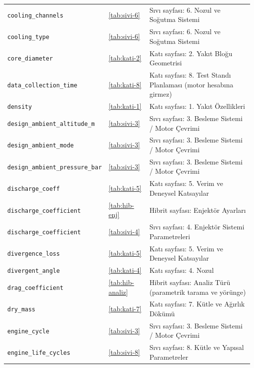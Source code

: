 \documentclass[11pt,a4paper]{article}
\begin{document}
{\begin{longtable}{@{}>{\raggedright\arraybackslash}p{5.2cm}p{1.4cm}>{\raggedright\arraybackslash}p{7.4cm}@{}}
\texttt{cooling\_\allowbreak{}channels} & \ref{tab:sivi-6} & Sıvı sayfası: 6. Nozul ve Soğutma Sistemi \\
\texttt{cooling\_\allowbreak{}type} & \ref{tab:sivi-6} & Sıvı sayfası: 6. Nozul ve Soğutma Sistemi \\
\texttt{core\_\allowbreak{}diameter} & \ref{tab:kati-2} & Katı sayfası: 2. Yakıt Bloğu Geometrisi \\
\texttt{data\_\allowbreak{}collection\_\allowbreak{}time} & \ref{tab:kati-8} & Katı sayfası: 8. Test Standı Planlaması (motor hesabına girmez) \\
\texttt{density} & \ref{tab:kati-1} & Katı sayfası: 1. Yakıt Özellikleri \\
\texttt{design\_\allowbreak{}ambient\_\allowbreak{}altitude\_\allowbreak{}m} & \ref{tab:sivi-3} & Sıvı sayfası: 3. Besleme Sistemi / Motor Çevrimi \\
\texttt{design\_\allowbreak{}ambient\_\allowbreak{}mode} & \ref{tab:sivi-3} & Sıvı sayfası: 3. Besleme Sistemi / Motor Çevrimi \\
\texttt{design\_\allowbreak{}ambient\_\allowbreak{}pressure\_\allowbreak{}bar} & \ref{tab:sivi-3} & Sıvı sayfası: 3. Besleme Sistemi / Motor Çevrimi \\
\texttt{discharge\_\allowbreak{}coeff} & \ref{tab:kati-5} & Katı sayfası: 5. Verim ve Deneysel Katsayılar \\
\texttt{discharge\_\allowbreak{}coefficient} & \ref{tab:hib-enj} & Hibrit sayfası: Enjektör Ayarları \\
\texttt{discharge\_\allowbreak{}coefficient} & \ref{tab:sivi-4} & Sıvı sayfası: 4. Enjektör Sistemi Parametreleri \\
\texttt{divergence\_\allowbreak{}loss} & \ref{tab:kati-5} & Katı sayfası: 5. Verim ve Deneysel Katsayılar \\
\texttt{divergent\_\allowbreak{}angle} & \ref{tab:kati-4} & Katı sayfası: 4. Nozul \\
\texttt{drag\_\allowbreak{}coefficient} & \ref{tab:hib-analiz} & Hibrit sayfası: Analiz Türü (parametrik tarama ve yörünge) \\
\texttt{dry\_\allowbreak{}mass} & \ref{tab:kati-7} & Katı sayfası: 7. Kütle ve Ağırlık Dökümü \\
\texttt{engine\_\allowbreak{}cycle} & \ref{tab:sivi-3} & Sıvı sayfası: 3. Besleme Sistemi / Motor Çevrimi \\
\texttt{engine\_\allowbreak{}life\_\allowbreak{}cycles} & \ref{tab:sivi-8} & Sıvı sayfası: 8. Kütle ve Yapısal Parametreler \\

\end{longtable}}
\end{document}
